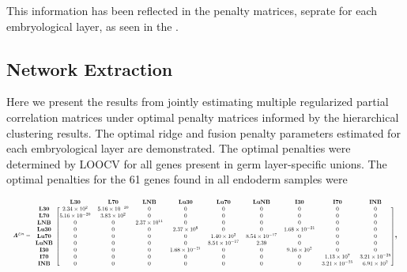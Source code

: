 \documentclass[
	a4paper, %
	10pt, %
	unnumberedsections, %
	twoside, %
]{LTJournalArticle}
\begin{document}
\noindent This information has been reflected in the penalty matrices,
seprate for each embryological layer, as seen in the .

\subsection{\normalsize Network Extraction}\label{netextr}
Here we present the results from jointly estimating multiple regularized 
partial correlation matrices 
under optimal penalty matrices informed by the hierarchical clustering 
results. The optimal ridge and fusion 
penalty parameters estimated for each embryological layer are demonstrated.
The optimal penalties were determined by LOOCV for all genes present 
in germ layer-specific unions. 
The optimal penalties for the 61 genes found in all endoderm 
samples were

\[
\resizebox{\columnwidth}{!}{%
    $\bm{\varLambda}^{En} = 
    \begin{blockarray}{*{10}{c}}
     & \mathbf{L30} & \mathbf{L70} & \mathbf{LNB} & \mathbf{Lu30} & \mathbf{Lu70} & \mathbf{LuNB} & \mathbf{I30} & \mathbf{I70} & \mathbf{INB} \\
    \begin{block}{c [ccccccccc]}
    \mathbf{L30} & 2.34 \times 10^{2} & 5.16 \times 10^{-20} & 0 & 0 & 0 & 0 & 0 & 0 & 0 \\
    \mathbf{L70} & 5.16 \times 10^{-20} & 3.83 \times 10^{2} & 0 & 0 & 0 & 0 & 0 & 0 & 0 \\
    \mathbf{LNB} & 0 & 0 & 2.37 \times 10^{11} & 0 & 0 & 0 & 0 & 0 & 0 \\
    \mathbf{Lu30} & 0 & 0 & 0 & 2.37 \times 10^{8} & 0 & 0 & 1.68 \times 10^{-21} & 0 & 0 \\
    \mathbf{Lu70} & 0 & 0 & 0 & 0 & 1.40 \times 10^{2} & 8.54 \times 10^{-17} & 0 & 0 & 0 \\
    \mathbf{LuNB} & 0 & 0 & 0 & 0 & 8.54 \times 10^{-17} & 2.39 & 0 & 0 & 0 \\
    \mathbf{I30} & 0 & 0 & 0 & 1.68 \times 10^{-21} & 0 & 0 & 9.16 \times 10^{2} & 0 & 0 \\
    \mathbf{I70} & 0 & 0 & 0 & 0 & 0 & 0 & 0 & 1.13 \times 10^{7} & 3.21 \times 10^{-25} \\
    \mathbf{INB} & 0 & 0 & 0 & 0 & 0 & 0 & 0 & 3.21 \times 10^{-25} & 6.91 \times 10^{2} \\
    \end{block}
    \end{blockarray}$},
\]
\end{document}
